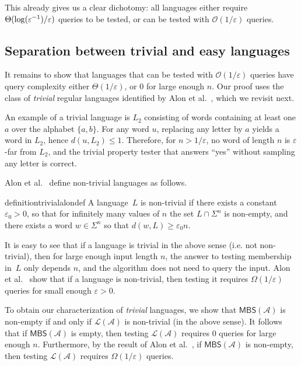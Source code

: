\documentclass[letterpaper, USenglish, cleveref, autoref, thm-restate, numberwithinsect]{lipics-v2021}
\theoremstyle{theorem}
\theoremstyle{definition}
\newcommand{\Aa}{\mathcal{A}}
\newcommand{\cO}{\mathcal{O}}
\newcommand{\eps}{\varepsilon}
\newcommand{\lang}[1]{\mathcal{L}(#1)}
\newcommand{\MBS}{\textsf{MBS}\xspace}
\newcommand{\set}[1]{\{ #1 \}}
\newcommand{\epslogeps}[1][]
{\ifthenelse{\equal{#1}{}}{\log(\eps^{-1})/\eps}{\log^{ #1 }(\eps^{-1})/\eps}}
\begin{document}
This already gives us a clear dichotomy: all languages either require $\Theta(\epslogeps)$ queries to be tested, or can be tested with $\cO(1/\eps)$ queries.


\subsection{Separation between trivial and easy languages}

It remains to show that languages that can be tested with $\cO(1/\eps)$ queries have query complexity either $\Theta(1/\eps)$, or $0$ for large enough $n$.
Our proof uses the class of \emph{trivial} regular languages identified by Alon et al.~\cite{alon2001regular}, which we revisit next.

An example of a trivial language is $L_2$ consisting of words containing at least one $a$ over the alphabet $\set{a,b}$.
For any word $u$, replacing any letter by $a$ yields a word in $L_2$, hence $d(u,L_2) \le 1$.
Therefore, for $n > 1/\eps$, no word of length $n$ is $\eps$-far from $L_2$, and the trivial property tester that answers ``yes'' without sampling any letter is correct.

Alon et al.~\cite{alon2001regular} define non-trivial languages as follows.
\begin{restatable}{definition}{trivialalondef}\label{def:trivial-alon}
	A language~$L$ is non-trivial if there exists a constant $\eps_0 > 0$, so that for infinitely
	many values of $n$ the set $L\cap\Sigma^n$ is non-empty, and there exists a word $w \in \Sigma^n$ so that $d(w, L) \ge \eps_0 n$.
\end{restatable}
It is easy to see that if a language is trivial in the above sense (i.e. not non-trivial), then for large enough input length $n$, the answer to testing membership in~$L$ only depends $n$, and the algorithm does not need to query the input.
Alon et al.~\cite[Property 2]{alon2001regular} show that if a language is non-trivial, then testing it requires $\Omega(1/\eps)$ queries for small enough $\eps > 0$.

To obtain our characterization of \emph{trivial} languages, we show that $\MBS(\Aa)$ is non-empty if and only if $\lang{\Aa}$ is non-trivial (in the above sense).
It follows that if $\MBS(\Aa)$ is empty, then testing $\lang{\Aa}$ requires $0$ queries for large enough $n$.
Furthermore, by the result of Alon et al.~\cite{alon2001regular}, if $\MBS(\Aa)$ is non-empty, then testing $\lang{\Aa}$ requires $\Omega(1/\eps)$ queries.
\end{document}
